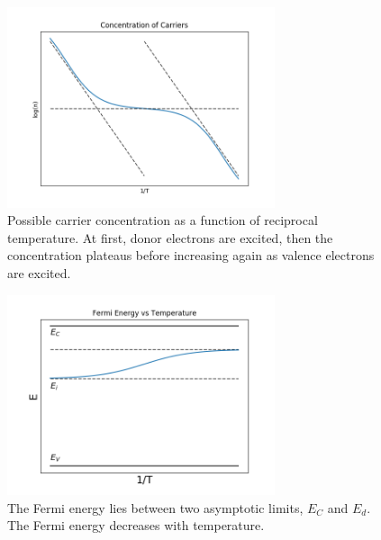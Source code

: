 \documentclass[11pt]{amsart}
\begin{document}
\begin{figure}
\centering
	\includegraphics[width = 0.7\textwidth]{carrierconcentration.png}
	\caption{Possible carrier concentration as a function of reciprocal temperature. At first, donor electrons are excited, then the concentration plateaus before increasing again as valence electrons are excited.}
\end{figure}

\begin{figure}
\centering
	\includegraphics[width = 0.7\textwidth]{fermiandtemp.png}
	\caption{The Fermi energy lies between two asymptotic limits, $E_C$ and $E_d$. The Fermi energy decreases with temperature.}
\end{figure}
\end{document}
